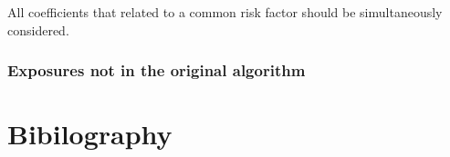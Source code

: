 \documentclass[]{book}
\begin{document}
All coefficients that related to a common risk factor should be simultaneously considered.

\hypertarget{exposures-not-in-the-original-algorithm}{%
\subsection{Exposures not in the original algorithm}\label{exposures-not-in-the-original-algorithm}}

\hypertarget{bibilography}{%
\chapter{Bibilography}\label{bibilography}}


\end{document}
